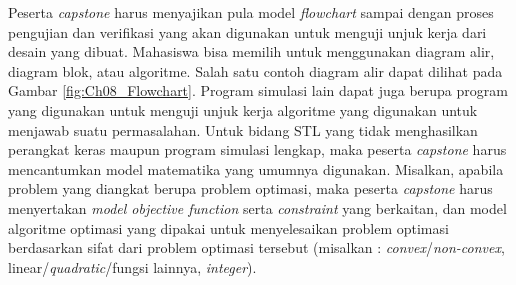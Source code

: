     Peserta \textit{capstone} harus menyajikan pula model \textit{flowchart} sampai dengan proses pengujian dan verifikasi yang akan digunakan untuk menguji unjuk kerja dari desain yang dibuat. Mahasiswa bisa memilih untuk menggunakan diagram alir, diagram blok, atau algoritme. Salah satu contoh diagram alir dapat dilihat pada Gambar \ref{fig:Ch08_Flowchart}. Program simulasi lain dapat juga berupa program yang digunakan untuk menguji unjuk kerja algoritme yang digunakan untuk menjawab suatu permasalahan. Untuk bidang STL yang tidak menghasilkan perangkat keras maupun program simulasi lengkap, maka peserta \textit{capstone} harus mencantumkan model matematika yang umumnya digunakan. Misalkan, apabila problem yang diangkat berupa problem optimasi, maka peserta \textit{capstone} harus menyertakan \textit{model objective function} serta \textit{constraint} yang berkaitan, dan model algoritme optimasi yang dipakai untuk menyelesaikan problem optimasi berdasarkan sifat dari problem optimasi tersebut (misalkan : \textit{convex}/\textit{non-convex}, linear/\textit{quadratic}/fungsi lainnya, \textit{integer}).
